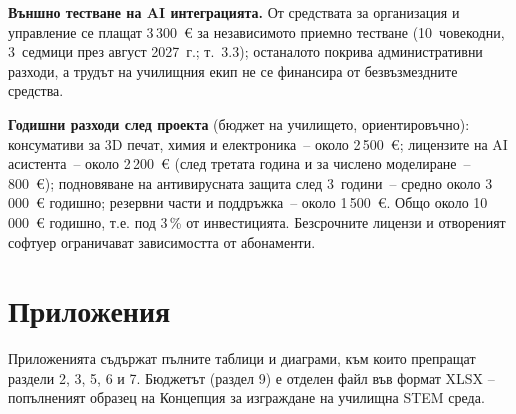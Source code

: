 \documentclass[11pt,a4paper]{article}
\begin{document}
\textbf{Външно тестване на AI интеграцията.} От средствата за организация и управление се плащат 3\,300~€ за независимото приемно тестване (10~човекодни, 3~седмици през август 2027~г.; т.~3.3); останалото покрива административни разходи, а трудът на училищния екип не се финансира от безвъзмездните средства.

\textbf{Годишни разходи след проекта} (бюджет на училището, ориентировъчно): консумативи за 3D печат, химия и електроника~– около 2\,500~€; лицензите на AI асистента~– около 2\,200~€ (след третата година и за числено моделиране~– 800~€); подновяване на антивирусната защита след 3~години~– средно около 3\,000~€ годишно; резервни части и поддръжка~– около 1\,500~€. Общо около 10\,000~€ годишно, т.е. под 3\,\% от инвестицията. Безсрочните лицензи и отвореният софтуер ограничават зависимостта от абонаменти.

\clearpage
\section*{Приложения}
Приложенията съдържат пълните таблици и диаграми, към които препращат раздели 2, 3, 5, 6 и 7. Бюджетът (раздел 9) е отделен файл във формат XLSX – попълненият образец на Концепция за изграждане на училищна STEM среда.

\providecommand{\sIIbadge}[2]{{\setlength{\fboxsep}{0.8pt}\colorbox{#1}{\makebox[8.6pt]{\textcolor{white}{\bfseries\tiny #2}}}}}
\providecommand{\sIIbM}{\sIIbadge{sIIcM}{М}}
\providecommand{\sIIbI}{\sIIbadge{sIIcI}{И}}
\providecommand{\sIIbIT}{\sIIbadge{sIIcIT}{ИТ}}
\providecommand{\sIIbF}{\sIIbadge{sIIcF}{Ф}}
\providecommand{\sIIbH}{\sIIbadge{sIIcH}{Х}}
\providecommand{\sIIbB}{\sIIbadge{sIIcB}{Б}}
\providecommand{\sIIbG}{\sIIbadge{sIIcG}{Г}}
\providecommand{\sIIball}{\sIIbM\hspace{0.5pt}\sIIbI\hspace{0.5pt}\sIIbIT\hspace{0.5pt}\sIIbF\hspace{0.5pt}\sIIbH\hspace{0.5pt}\sIIbB\hspace{0.5pt}\sIIbG}
\end{document}
